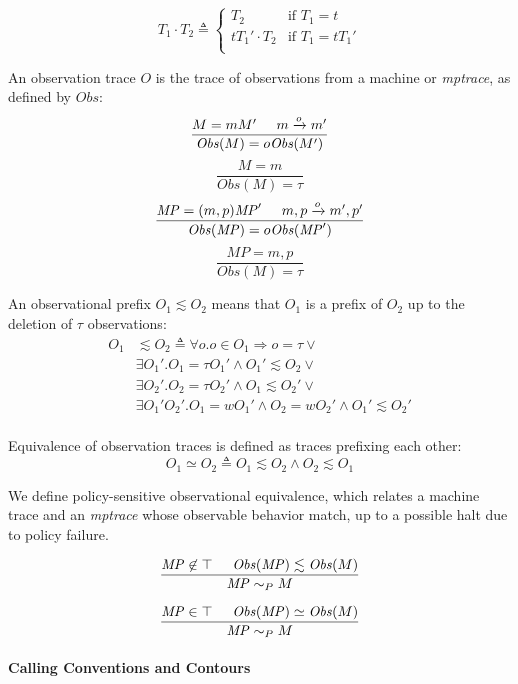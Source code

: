 \documentclass[conference]{IEEEtran}
\newcommand{\MP}{\mathit{MP}}
\begin{document}
    \[T_1 \cdot T_2 \triangleq
      \begin{cases}
        T_2 & \text{if } T_1 = t \\
        t T_1' \cdot T_2 & \text{if } T_1 = t T_1' \\
      \end{cases}\]

    An observation trace \(O\) is the trace of observations from a machine or {\it mptrace},
    as defined by \(\mathit{Obs}\):
    \[\frac{M = mM' \hspace{.5cm} m \xrightarrow{o} m'}
           {\mathit{Obs}(M) = o\mathit{Obs}(M')}\]
    \[\frac{M = m}
           {\mathit{Obs}(M) = \tau}\]
    \[\frac{\MP = (m,p)\MP' \hspace{.5cm} m,p \xrightarrow{o} m',p'}
           {\mathit{Obs}(\MP) = o \mathit{Obs}(\MP')}\]
    \[\frac{\MP = m,p}
           {\mathit{Obs}(M) = \tau}\]

    An observational prefix \(O_1 \lesssim O_2\) means that \(O_1\) is a prefix of \(O_2\) up to the deletion
    of \(\tau\) observations:
    \[\begin{split}
      O_1 & \lesssim O_2 \triangleq \forall o . o \in O_1 \Rightarrow o = \tau \lor \\
      & \exists O_1' . O_1 = \tau O_1' \land O_1' \lesssim O_2 \lor \\
      & \exists O_2' .  O_2 = \tau O_2' \land O_1 \lesssim O_2' \lor \\
      & \exists O_1' O_2' . O_1 = w O_1' \land O_2 = w O_2' \land O_1' \lesssim O_2' \\
    \end{split}\]
    
    Equivalence of observation traces is defined as traces prefixing each other:
    \[O_1 \simeq O_2 \triangleq O_1 \lesssim O_2 \land O_2 \lesssim O_1\]

    We define policy-sensitive observational equivalence, which relates a machine trace and
    an {\it mptrace} whose observable behavior match, up to a possible halt due to policy failure.

    \[\frac{\MP \not \in \top \hspace{.5cm} \mathit{Obs}(\MP) \lesssim \mathit{Obs}(M)}
           {\MP \sim_P M}\]
    
    \[\frac{\MP \in \top \hspace{.5cm} \mathit{Obs}(\MP) \simeq \mathit{Obs}(M)}
           {\MP \sim_P M}\]
    
  \paragraph{Calling Conventions and Contours}
\end{document}
